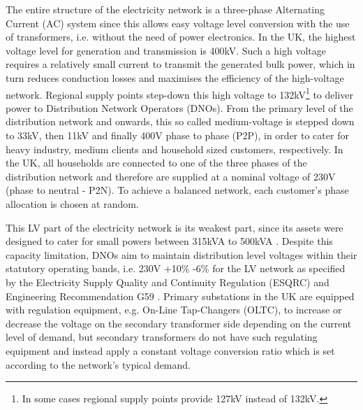 The entire structure of the electricity network is a three-phase Alternating Current (AC) system since this allows easy voltage level conversion with the use of transformers, i.e. without the need of power electronics.
In the UK, the highest voltage level for generation and transmission is 400kV.
Such a high voltage requires a relatively small current to transmit the generated bulk power, which in turn reduces conduction losses and maximises the efficiency of the high-voltage network.
Regional supply points step-down this high voltage to 132kV\footnote{In some cases regional supply points provide 127kV instead of 132kV.} to deliver power to Distribution Network Operators (DNOs).
From the primary level of the distribution network and onwards, this so called medium-voltage is stepped down to 33kV, then 11kV and finally 400V phase to phase (P2P), in order to cater for heavy industry, medium clients and household sized customers, respectively.
In the UK, all households are connected to one of the three phases of the distribution network and therefore are supplied at a nominal voltage of 230V (phase to neutral - P2N).
To achieve a balanced network, each customer's phase allocation is chosen at random.


This LV part of the electricity network is its weakest part, since its assets were designed to cater for small powers between 315kVA to 500kVA \cite{EDS08-0115}.
Despite this capacity limitation, DNOs aim to maintain distribution level voltages within their statutory operating bands, i.e. 230V +10\% -6\% for the LV network as specified by the Electricity Supply Quality and Continuity Regulation (ESQRC) \cite{HealthandSafetyExecutive2002} and Engineering Recommendation G59 \cite{EnergyNetworksAssociation2013}.
Primary substations in the UK are equipped with regulation equipment, e.g. On-Line Tap-Changers (OLTC), to increase or decrease the voltage on the secondary transformer side depending on the current level of demand, but secondary transformers do not have such regulating equipment and instead apply a constant voltage conversion ratio which is set according to the network's typical demand.

